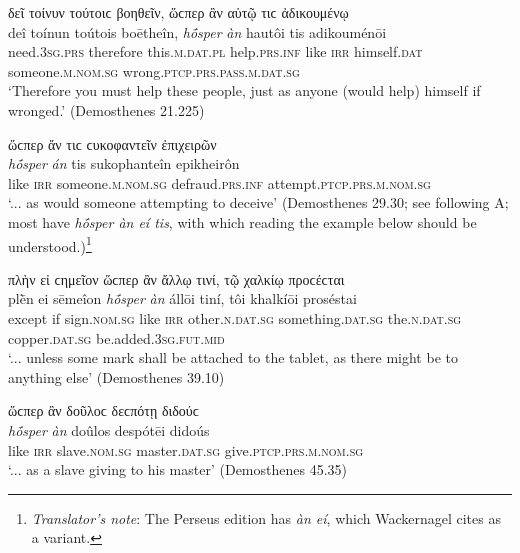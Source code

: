 \begin{exe}
\ex δεῖ τοίνυν τούτοιϲ βοηθεῖν, ὥϲπερ ἂν αὑτῷ τιϲ ἀδικουμένῳ\\
\gll deî toínun toútois boētheîn, \emph{hṓsper} \emph{àn} hautôi tis adikouménōi\\
need.\textsc{3sg.prs} therefore this.\textsc{m.dat.pl} help.\textsc{prs.inf} like \textsc{irr} himself.\textsc{dat} someone.\textsc{m.nom.sg} wrong.\textsc{ptcp.prs.pass.m.dat.sg}\\
\trans `Therefore you must help these people, just as anyone (would help) himself if wronged.' (Demosthenes 21.225)
\label{osperan14}
\end{exe}

\begin{exe}
\ex ὥϲπερ ἄν τιϲ ϲυκοφαντεῖν ἐπιχειρῶν\\
\gll \emph{hṓsper} \emph{án} tis sukophanteîn epikheirôn\\
like \textsc{irr} someone.\textsc{m.nom.sg} defraud.\textsc{prs.inf} attempt.\textsc{ptcp.prs.m.nom.sg}\\
\trans `... as would someone attempting to deceive' (Demosthenes 29.30; see \citet[354]{DindorfBlass1888} following A; most have \emph{hṓsper àn eí tis}, with which reading the example below should be understood.)\footnote{\emph{Translator's note}: The Perseus edition has \textit{àn eí}, which Wackernagel cites as a variant.}
\label{osperan15}
\end{exe}

\begin{exe}
\ex πλὴν εἰ ϲημεῖον ὥϲπερ ἂν ἄλλῳ τινί, τῷ χαλκίῳ προϲέϲται\\
\gll plḕn ei sēmeîon \emph{hṓsper} \emph{àn} állōi tiní, tôi khalkíōi proséstai\\
except if sign.\textsc{nom.sg} like \textsc{irr} other.\textsc{n.dat.sg} something.\textsc{dat.sg} the.\textsc{n.dat.sg} copper.\textsc{dat.sg} be.added.\textsc{3sg.fut.mid}\\
\trans `... unless some mark shall be attached to the tablet, as there might be to anything else' (Demosthenes 39.10)
\label{osperan16}
\end{exe}

\begin{exe}
\ex ὥϲπερ ἂν δοῦλοϲ δεϲπότῃ διδούϲ\\
\gll \emph{hṓsper} \emph{àn} doûlos despótēi didoús\\
like \textsc{irr} slave.\textsc{nom.sg} master.\textsc{dat.sg} give.\textsc{ptcp.prs.m.nom.sg}\\
\trans `... as a slave giving to his master' (Demosthenes 45.35)
\label{osperan17}
\end{exe}

